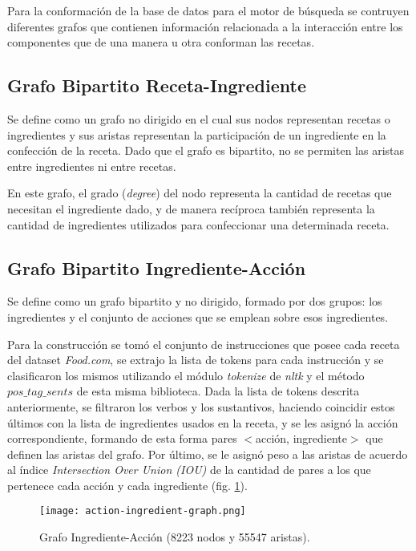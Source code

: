 \documentclass[
	a4paper, %
	10pt, %
	unnumberedsections, %
	twoside, %
]{LTJournalArticle}
\begin{document}
Para la conformación de la base de datos para el motor de búsqueda se contruyen diferentes grafos que
contienen información relacionada a la interacción entre los componentes que de una manera u otra conforman
las recetas.

\subsection{Grafo Bipartito Receta-Ingrediente}

Se define como un grafo no dirigido en el cual sus nodos representan
recetas o ingredientes y sus aristas representan la participación de un ingrediente en la confección de la receta.
Dado que el grafo es bipartito, no se permiten las aristas entre ingredientes ni entre recetas.

En este grafo, el grado (\textit{degree}) del nodo representa la cantidad de recetas que necesitan
el ingrediente dado, y de manera recíproca también representa la cantidad de ingredientes utilizados para 
confeccionar una determinada receta.

\subsection{Grafo Bipartito Ingrediente-Acción}

Se define como un grafo bipartito y no dirigido, formado por dos grupos: los ingredientes y el conjunto de 
acciones que se emplean sobre esos ingredientes. 

Para la construcción se tomó el conjunto de instrucciones que posee cada receta del dataset \textit{Food.com},
se extrajo la lista de tokens para cada instrucción y se clasificaron los mismos utilizando el módulo 
\emph{tokenize} de \textit{nltk} y el método \emph{$pos\_tag\_sents$} de esta misma biblioteca. Dada la 
lista de tokens descrita anteriormente, se filtraron los verbos y los sustantivos, haciendo coincidir estos 
últimos con la lista de ingredientes usados en la receta, y se les asignó la acción correspondiente, formando 
de esta forma pares $<$acción, ingrediente$>$ que definen las aristas del grafo. Por último, se le asignó peso 
a las aristas de acuerdo al índice \textit{Intersection Over Union (IOU)} de la cantidad de pares a los que 
pertenece cada acción y cada ingrediente (fig. \ref{fig:ingredient-action-graph}). 

\begin{figure}
	\texttt{[image: action-ingredient-graph.png]}
	\caption{Grafo Ingrediente-Acción (8223 nodos y 55547 aristas).}
	\label{fig:ingredient-action-graph}
\end{figure}
\end{document}
